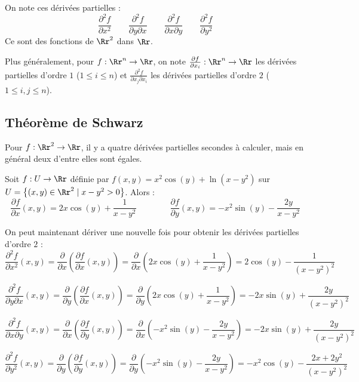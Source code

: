 On note ces dérivées partielles :
$$\frac{\partial ^2 f}{\partial x^2}
\qquad
\frac{\partial ^2 f}{\partial y\partial x}
\qquad
\frac{\partial ^2 f}{\partial x\partial y}
\qquad
\frac{\partial ^2 f}{\partial y^2}
$$
Ce sont des fonctions de $\Rr^2$ dans $\Rr$.


Plus généralement, pour $f : \Rr^n \to \Rr$, on note $\frac{\partial f}{\partial x_i} : \Rr^n \to \Rr$ les dérivées partielles d'ordre $1$ ($1 \le i \le n$)
et $\frac{\partial ^2f}{\partial x_j\partial x_i}$ les dérivées partielles d'ordre $2$ ($1 \le i,j \le n$).


\subsection{Théorème de Schwarz}


Pour $f : \Rr^2 \to \Rr$, il y a quatre dérivées partielles secondes à calculer, mais en général deux d'entre elles sont égales.

\begin{exemple}{}{}
Soit $f : U \to \Rr$ définie par $f(x,y) = x^2\cos(y) + \ln(x-y^2)$ sur $U = \big\{ (x,y) \in \Rr^2 \mid x-y^2>0 \big\}$.
Alors :
$$\frac{\partial f}{\partial x}(x,y) = 2x\cos(y) + \frac{1}{x-y^2}
\qquad\qquad
\frac{\partial f}{\partial y}(x,y) = -x^2\sin(y) - \frac{2y}{x-y^2}$$

On peut maintenant dériver une nouvelle fois pour obtenir les dérivées partielles d'ordre $2$ :
$$\frac{\partial ^2 f}{\partial x^2}(x,y) 
= \frac{\partial}{\partial x}\left(\frac{\partial f}{\partial x}(x,y)\right)
= \frac{\partial}{\partial x}\left(2x\cos(y) + \frac{1}{x-y^2}\right)
= 2\cos(y) - \frac{1}{(x-y^2)^2}$$

$$\frac{\partial ^2 f}{\partial y\partial x}(x,y) 
= \frac{\partial}{\partial y}\left(\frac{\partial f}{\partial x}(x,y)\right)
= \frac{\partial}{\partial y}\left(2x\cos(y) + \frac{1}{x-y^2}\right)
= \boxed{-2x\sin(y) + \frac{2y}{(x-y^2)^2}}$$

$$\frac{\partial ^2 f}{\partial x\partial y}(x,y) 
= \frac{\partial}{\partial x}\left(\frac{\partial f}{\partial y}(x,y)\right)
= \frac{\partial}{\partial x}\left(-x^2\sin(y) - \frac{2y}{x-y^2}\right)
= \boxed{-2x\sin(y) + \frac{2y}{(x-y^2)^2}}$$

$$\frac{\partial ^2 f}{\partial y^2}(x,y) 
= \frac{\partial}{\partial y}\left(\frac{\partial f}{\partial y}(x,y)\right)
= \frac{\partial}{\partial y}\left(-x^2\sin(y) - \frac{2y}{x-y^2}\right)
= -x^2\cos(y) - \frac{2x+2y^2}{(x-y^2)^2}$$


\end{exemple}

